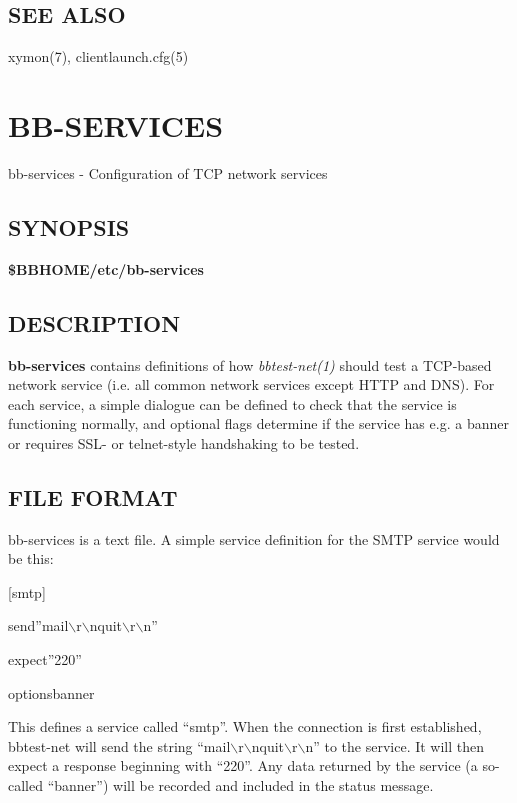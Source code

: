 \subsection{SEE ALSO}
xymon(7), clientlaunch.cfg(5) 

 


  

%
\newpage
\section{BB-SERVICES}

 bb-services - Configuration of TCP network services 

 
\subsection{SYNOPSIS}
\textbf{\$BBHOME/etc/bb-services}


 
\subsection{DESCRIPTION}
\textbf{bb-services}
 contains definitions of how \emph{bbtest-net(1)}
 should test a TCP-based network service (i.e. all common network services except HTTP and DNS). For each service, a simple dialogue can be defined to check that the service is functioning normally, and optional flags determine if the service has e.g. a banner or requires SSL- or telnet-style handshaking to be tested. 

 
\subsection{FILE FORMAT}
 bb-services is a text file. A simple service definition for the SMTP service would be this:  


  
[smtp]  
 
send''mail$\backslash$r$\backslash$nquit$\backslash$r$\backslash$n''  
 
expect''220''  
 
optionsbanner  



  This defines a service called ``smtp''. When the connection is first established, bbtest-net will send the string ``mail$\backslash$r$\backslash$nquit$\backslash$r$\backslash$n'' to the service. It will then expect a response beginning with ``220''. Any data returned by the service (a so-called ``banner'') will be recorded and included in the status message. 


